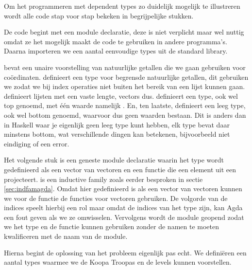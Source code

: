 Om het programmeren met dependent types zo duidelijk mogelijk te illustreren
wordt alle code stap voor stap bekeken in begrijpelijke stukken.  

De code begint met een module declaratie, deze is niet verplicht maar wel
nuttig omdat ze het mogelijk maakt de code te gebruiken in andere programma's.
Daarna importeren we een aantal eenvoudige types uit de standard library.


 bevat een unaire voorstelling van natuurlijke getallen die we
gaan gebruiken voor coördinaten.  definieert een type voor
begrensde natuurlijke getallen, dit gebruiken we zodat we bij index operaties
niet buiten het bereik van een lijst kunnen gaan.  definieert
lijsten met een vaste lengte, vectors dus.  definieert een
type,  ook wel top genoemd, met één waarde namelijk . En,
ten laatste,  definieert een leeg type,  ook wel
bottom genoemd, waarvoor dus geen waarden bestaan. Dit is anders dan in Haskell
waar je eigenlijk geen leeg type kunt hebben, elk type bevat daar minstens
bottom, wat verschillende dingen kan betekenen, bijvoorbeeld niet eindiging of
een error.

Het volgende stuk is een geneste module declaratie waarin het type
 wordt gedefinieerd als een vector van vectoren en een functie
die een element uit een  projecteert.  is een
inductive family zoals eerder besproken in sectie \ref{sec:indfamagda}. Omdat
 hier gedefinieerd is als een vector van vectoren kunnen we voor
de  functie de  functies voor vectoren gebruiken.
De volgorde van de indices speelt hierbij een rol maar omdat de indices van het
type  zijn, kan Agda een fout geven als we ze omwisselen.
Vervolgens wordt de module geopend zodat we het type en de functie kunnen
gebruiken zonder de namen te moeten kwalificeren met de naam van de module.


Hierna begint de oplossing van het probleem eigenlijk pas echt. We definiëren
een aantal types waarmee we de Koopa Troopas en de levels kunnen voorstellen.


